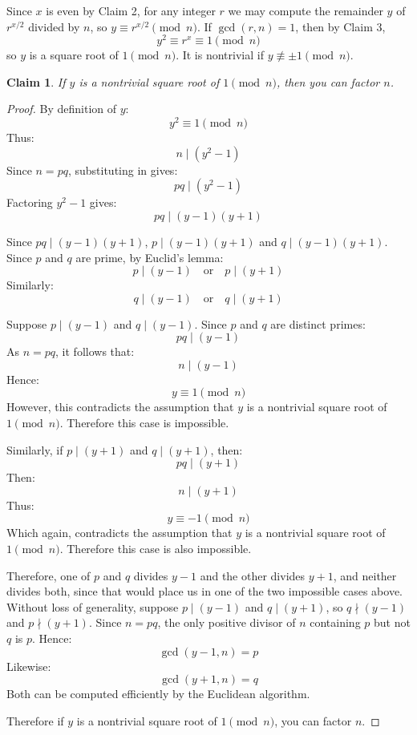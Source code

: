 \documentclass{article}
\newtheorem{claim}{Claim}
\begin{document}
Since $x$ is even by Claim 2, for any integer $r$ we may compute the remainder $y$ of $r^{x/2}$ divided by 
$n$, so $y \equiv r^{x/2} \pmod{n}$. If $\gcd(r, n) = 1$, then by Claim 3,
\[
y^2 \equiv r^{x} \equiv 1 \pmod{n}
\]
so $y$ is a square root of $1 \pmod{n}$. It is nontrivial if $y \not\equiv \pm 1 \pmod{n}$.

\begin{claim}
    If $y$ is a nontrivial square root of $1 \pmod{n}$, then you can factor $n$.
\end{claim}

\begin{proof}
    By definition of $y$:
    \[
    y^{2} \equiv 1 \pmod{n}
    \]
    Thus:
    \[
    n \mid (y^{2} - 1)
    \]
    Since $n = pq$, substituting in gives:
    \[
    pq \mid (y^{2} - 1)
    \]
    Factoring $y^{2} - 1$ gives:
    \[
    pq \mid (y - 1)(y + 1)
    \]

    \medskip

    Since $pq \mid (y - 1)(y + 1)$, $p \mid (y - 1)(y + 1)$ and $q \mid (y - 1)(y + 1)$. Since $p$ and $q$ 
    are prime, by Euclid's lemma:
    \[
    p \mid (y - 1) \quad \text{or} \quad p \mid (y + 1)
    \]
    Similarly:
    \[
    q \mid (y - 1) \quad \text{or} \quad q \mid (y + 1)
    \]

    \medskip

    Suppose $p \mid (y - 1)$ and $q \mid (y - 1)$. Since $p$ and $q$ are distinct primes:
    \[
    pq \mid (y - 1)
    \]
    As $n = pq$, it follows that:
    \[
    n \mid (y - 1)
    \]
    Hence:
    \[
    y \equiv 1 \pmod{n}
    \]
    However, this contradicts the assumption that $y$ is a nontrivial square root of $1 \pmod{n}$. 
    Therefore this case is impossible.

    \medskip

    Similarly, if $p \mid (y + 1)$ and $q \mid (y + 1)$, then:
    \[
    pq \mid (y + 1)
    \]
    Then:
    \[
    n \mid (y + 1)
    \]
    Thus:
    \[
    y \equiv -1 \pmod{n}
    \]
    Which again, contradicts the assumption that $y$ is a nontrivial square root of $1 \pmod{n}$. Therefore 
    this case is also impossible.

    \medskip

    Therefore, one of $p$ and $q$ divides $y - 1$ and the other divides $y + 1$, and neither divides both, 
    since that would place us in one of the two impossible cases above. Without loss of generality, suppose
    $p \mid (y - 1)$ and $q \mid (y + 1)$, so $q \nmid (y - 1)$ and $p \nmid (y + 1)$. Since $n = pq$, the 
    only positive divisor of $n$ containing $p$ but not $q$ is $p$. Hence:
    \[
    \gcd(y - 1, n) = p
    \]
    Likewise:
    \[
    \gcd(y + 1, n) = q
    \]
    Both can be computed efficiently by the Euclidean algorithm.

    \medskip

    Therefore if $y$ is a nontrivial square root of $1 \pmod{n}$, you can factor $n$.
\end{proof}
\end{document}
